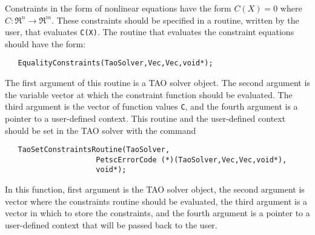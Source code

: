 Constraints in the form of nonlinear equations have the form
$C(X) = 0$ where $C: \Re^n \to \Re^m$.
These constraints should be specified in a 
routine, written by the user, that evaluates {\tt C(X)}.
The routine that evaluates the constraint equations should have the form:
\begin{verbatim}
   EqualityConstraints(TaoSolver,Vec,Vec,void*);
\end{verbatim}
\noindent
The first argument of this routine is a TAO solver object.  The second argument
is the variable vector at which the constraint function should be evaluated.  
The third argument is the vector of function values {\tt C}, and the fourth
argument is a pointer to a user-defined context.
This routine  and the user-defined context 
should be set in the TAO solver with the command
\begin{verbatim}
   TaoSetConstraintsRoutine(TaoSolver,
                     PetscErrorCode (*)(TaoSolver,Vec,Vec,void*),
                     void*);
\end{verbatim}
\noindent
In this function, first argument is the TAO solver object,
the second argument is vector where the constraints routine should be
evaluated, the third argument is a vector in which to store the constraints,
and the fourth argument is a pointer to a user-defined context that will
be passed back to the user.

